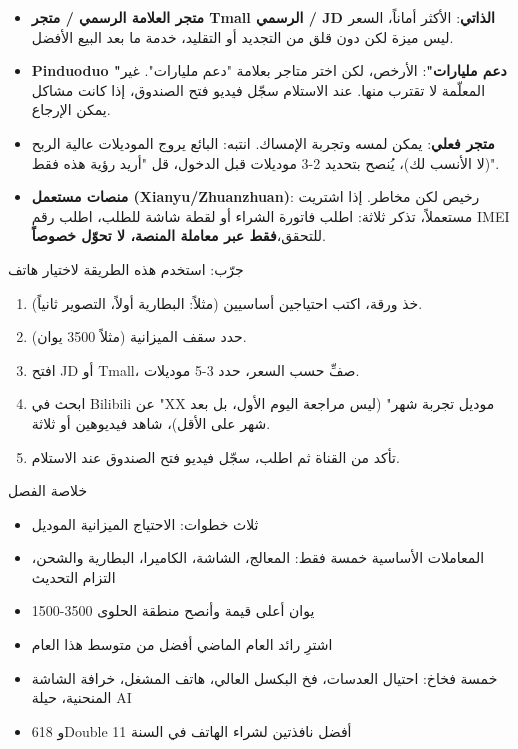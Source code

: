 
\begin{itemize}
  \item \textbf{متجر العلامة الرسمي / متجر Tmall الرسمي / JD الذاتي}: الأكثر أماناً، السعر ليس ميزة لكن دون قلق من التجديد أو التقليد، خدمة ما بعد البيع الأفضل.
  \item \textbf{Pinduoduo "دعم مليارات"}: الأرخص، لكن اختر متاجر بعلامة "دعم مليارات". غير المعلّمة لا تقترب منها. عند الاستلام سجّل فيديو فتح الصندوق، إذا كانت مشاكل يمكن الإرجاع.
  \item \textbf{متجر فعلي}: يمكن لمسه وتجربة الإمساك. انتبه: البائع يروج الموديلات عالية الربح (لا الأنسب لك)، يُنصح بتحديد 2-3 موديلات قبل الدخول، قل "أريد رؤية هذه فقط".
  \item \textbf{منصات مستعمل (Xianyu/Zhuanzhuan)}: رخيص لكن مخاطر. إذا اشتريت مستعملاً، تذكر ثلاثة: اطلب فاتورة الشراء أو لقطة شاشة للطلب، اطلب رقم IMEI للتحقق،\textbf{فقط عبر معاملة المنصة، لا تحوّل خصوصاً}.
\end{itemize}

\begin{tcbpractice}{جرّب: استخدم هذه الطريقة لاختيار هاتف}
\begin{enumerate}
  \item خذ ورقة، اكتب احتياجين أساسيين (مثلاً: البطارية أولاً، التصوير ثانياً).
  \item حدد سقف الميزانية (مثلاً 3500 يوان).
  \item افتح JD أو Tmall، صفِّ حسب السعر، حدد 3-5 موديلات.
  \item ابحث في Bilibili عن "XX موديل تجربة شهر" (ليس مراجعة اليوم الأول، بل بعد شهر على الأقل)، شاهد فيديوهين أو ثلاثة.
  \item تأكد من القناة ثم اطلب، سجّل فيديو فتح الصندوق عند الاستلام.
\end{enumerate}

\end{tcbpractice}

\begin{tcbsummary}{خلاصة الفصل}
\begin{itemize}
  \item ثلاث خطوات: الاحتياج الميزانية الموديل
  \item المعاملات الأساسية خمسة فقط: المعالج، الشاشة، الكاميرا، البطارية والشحن، التزام التحديث
  \item 1500-3500 يوان أعلى قيمة وأنصح منطقة الحلوى
  \item اشترِ رائد العام الماضي أفضل من متوسط هذا العام
  \item خمسة فخاخ: احتيال العدسات، فخ البكسل العالي، هاتف المشغل، خرافة الشاشة المنحنية، حيلة AI
  \item 618 وDouble 11 أفضل نافذتين لشراء الهاتف في السنة
\end{itemize}

\end{tcbsummary}
